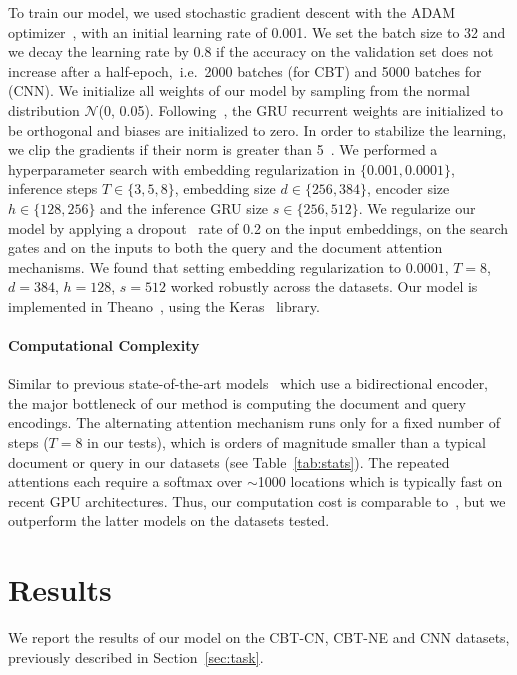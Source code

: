 \documentclass[11pt]{article}
\begin{document}
To train our model, we used stochastic gradient descent with the ADAM optimizer~\cite{adam}, with an initial learning rate of 0.001. We set the batch size to 32 and we decay the learning rate by 0.8 if the accuracy on the validation set does not increase after a half-epoch,~i.e.~2000 batches (for CBT) and 5000 batches for (CNN).
We initialize all weights of our model by sampling from the normal distribution $\mathcal{N}$(0, 0.05). Following~\cite{saxe2013exact}, the GRU recurrent weights are initialized to be orthogonal and biases are initialized to zero.
In order to stabilize the learning, we clip the gradients if their norm is greater than 5~\cite{Pascanu13}.
We performed a hyperparameter search with embedding regularization in $\{0.001, 0.0001\}$, inference steps $T \in \{3, 5, 8\}$, embedding size $d \in \{256, 384\}$, encoder size $h \in \{128, 256\}$ and the inference GRU size $s \in \{256, 512\}$. We regularize our model by applying a dropout~\cite{srivastava2014dropout} rate of 0.2 on the input embeddings, on the search gates and on the inputs to both the query and the document attention mechanisms. We found that setting embedding regularization to $0.0001$, $T=8$, $d=384$, $h=128$, $s=512$ worked robustly across the datasets. Our model is implemented in Theano~\cite{Theano12}, using the Keras~\cite{chollet2015keras} library.

\paragraph{Computational Complexity} Similar to previous state-of-the-art models~\cite{watson,danqi} which use a bidirectional encoder, the major bottleneck of our method is computing the document and query encodings. The alternating attention mechanism runs only for a fixed number of steps ($T = 8$ in our tests), which is orders of magnitude smaller than a typical document or query in our datasets (see Table~\ref{tab:stats}).
The repeated attentions each require a softmax over ${\sim}$1000 locations which is typically fast on recent GPU architectures. Thus, our computation cost is comparable to~\cite{watson,danqi}, but we outperform the latter models on the datasets tested.
 
\section{Results}
We report the results of our model on the CBT-CN, CBT-NE and CNN datasets, previously described in Section~\ref{sec:task}.
\end{document}
